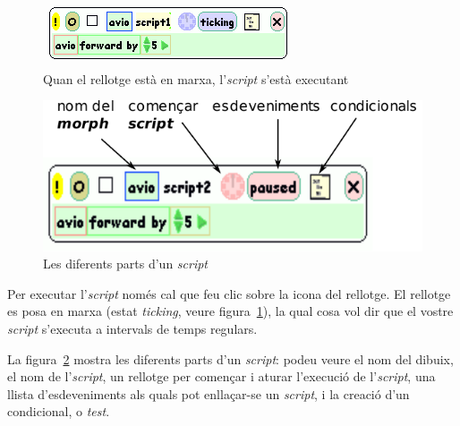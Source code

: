 \begin{figure}[h!]
\begin{center}
\includegraphics[scale=0.8]{Imatges/figura24-9}
\end{center}
\caption{Quan el rellotge està en marxa, l'\emph{script} s'està executant}
\label{fig2409}
\end{figure}

\begin{figure}[h!]
\begin{center}
\includegraphics[scale=1]{Imatges/figura24-10}
\end{center}
\caption{Les diferents parts d'un \emph{script}}
\label{fig2410}
\end{figure}
\newpage
Per executar l'\emph{script} només cal que feu clic sobre la icona del rellotge. El rellotge es posa en marxa (estat \emph{ticking}, veure figura~\ref{fig2409}), la qual cosa vol dir que el vostre \emph{script} s'executa a intervals de temps regulars.

La figura~\ref{fig2410} mostra les diferents parts d'un \emph{script}: podeu veure el nom del dibuix, el nom de l'\emph{script}, un rellotge per començar i aturar l'execució de l'\emph{script}, una llista d'esdeveniments als quals pot enllaçar-se un \emph{script}, i la creació d'un condicional, o \emph{test}.

